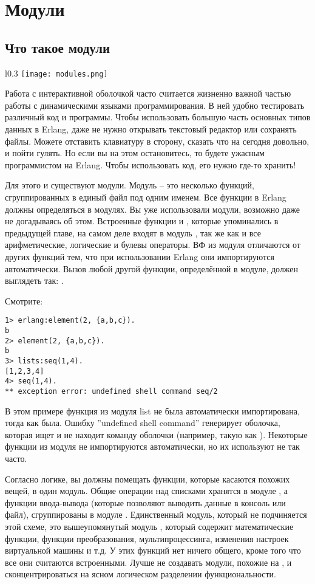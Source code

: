 \chapter{Модули}
\label{modules}
\section{Что такое модули}
\begin{wrapfigure}{l}{0.3\linewidth}
    \texttt{[image: modules.png]}
\end{wrapfigure}

Работа с интерактивной оболочкой часто считается жизненно важной частью работы с динамическими языками программирования.
В ней удобно тестировать различный код и программы.
Чтобы использовать большую часть основных типов данных в Erlang, даже не нужно открывать текстовый редактор или сохранять файлы.
Можете отставить клавиатуру в сторону, сказать что на сегодня довольно, и пойти гулять.
Но если вы на этом остановитесь, то будете ужасным программистом на Erlang.
Чтобы использовать код, его нужно где\--то хранить!

Для этого и существуют модули.
Модуль \--- это несколько функций, сгруппированных в единый файл под одним именем.
Все функции в Erlang должны определяться в модулях.
Вы уже использовали модули, возможно даже не догадываясь об этом.
Встроенные функции  и , которые упоминались в предыдущей главе, на самом деле входят в модуль , так же как и все арифметические, логические и булевы операторы.
ВФ из модуля  отличаются от других функций тем, что при использовании Erlang они импортируются автоматически.
Вызов любой другой функции, определённой в модуле, должен выглядеть так: .

Смотрите:
\begin{lstlisting}[style=repl]
1> erlang:element(2, {a,b,c}).
b
2> element(2, {a,b,c}).
b
3> lists:seq(1,4).
[1,2,3,4]
4> seq(1,4).
** exception error: undefined shell command seq/2
\end{lstlisting}

В этом примере функция  из модуля list не была автоматически импортирована, тогда как  была.
Ошибку ''undefined shell command'' генерирует оболочка, которая ищет и не находит команду оболочки (например, такую как ).
Некоторые функции из модуля  не импортируются автоматически, но их используют не так часто.

Согласно логике, вы должны помещать функции, которые касаются похожих вещей, в один модуль.
Общие операции над списками хранятся в модуле , а функции ввода\--вывода (которые позволяют выводить данные в консоль или файл), сгруппированы в модуле .
Единственный модуль, который не подчиняется этой схеме, это вышеупомянутый модуль , который содержит математические функции, функции преобразования, мультипроцессинга, изменения настроек виртуальной машины и т.д.
У этих функций нет ничего общего, кроме того что все они считаются встроенными.
Лучше не создавать модули, похожие на , и сконцентрироваться на ясном логическом разделении функциональности.
